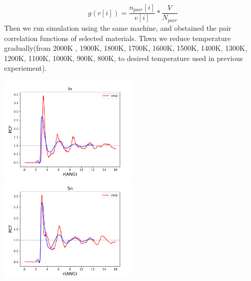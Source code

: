 \documentclass[12pt, letterpaper]{article}
\begin{document}
    \begin{equation}
        g(r[i]) = \frac{n_{pair}[i]}{v[i]} * \frac{V}{N_{pair}}
    \end{equation}
    Then we run simulation using the same machine, and obstained the pair correlation functions of selected materials. Thwn we reduce temperature gradually(from 2000K 
    , 1900K, 1800K, 1700K, 1600K, 1500K, 1400K, 1300K, 1200K, 1100K, 1000K, 900K, 800K, to desired temperature used in previous experiement).  

    \begin{adjustbox}{center,caption={Shows pair correlation fucntions of various liquid metals},label={somelabel},nofloat=figure,vspace=\bigskipamount}
        \includegraphics[width=0.5\textwidth]{pc.pdf}
        \includegraphics[width=0.5\textwidth]{Sn.pdf}
    \end{adjustbox}
\end{document}
